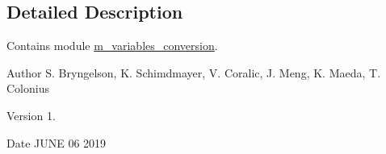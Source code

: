 \subsection{Detailed Description}
Contains module \hyperlink{namespacem__variables__conversion}{m\+\_\+variables\+\_\+conversion}. 

\begin{DoxyAuthor}{Author}
S. Bryngelson, K. Schimdmayer, V. Coralic, J. Meng, K. Maeda, T. Colonius 
\end{DoxyAuthor}
\begin{DoxyVersion}{Version}
1. 
\end{DoxyVersion}
\begin{DoxyDate}{Date}
J\+U\+NE 06 2019 
\end{DoxyDate}
